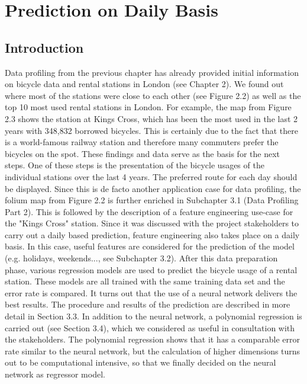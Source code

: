 \section{Prediction on Daily Basis}\label{sec:daily}
\subsection{Introduction}\label{intro_daily}
Data profiling from the previous chapter has already provided initial information on bicycle data and rental stations in London (see Chapter 2). We found out where most of the stations were close to each other (see Figure 2.2) as well as the top 10 most used rental stations in London. For example, the map from Figure 2.3 shows the station at Kings Cross, which has been the most used in the last 2 years with 348,832 borrowed bicycles. This is certainly due to the fact that there is a world-famous railway station and therefore many commuters prefer the bicycles on the spot. These findings and data serve as the basis for the next steps.
One of these steps is the presentation of the bicycle usages of the individual stations over the last 4 years. The preferred route for each day should be displayed. Since this is de facto another application case for data profiling, the folium map from Figure 2.2 is further enriched in Subchapter 3.1 (Data Profiling Part 2).
This is followed by the description of a feature engineering use-case for the "Kings Cross" station. Since it was discussed with the project stakeholders to carry out a daily based prediction, feature engineering also takes place on a daily basis. In this case, useful features are considered for the prediction of the model (e.g. holidays, weekends..., see Subchapter 3.2).
After this data preparation phase, various regression models are used to predict the bicycle usage of a rental station. These models are all trained with the same training data set and the error rate is compared. It turns out that the use of a neural network delivers the best results. The procedure and results of the prediction are described in more detail in Section 3.3.
In addition to the neural network, a polynomial regression is carried out (see Section 3.4), which we considered as useful in consultation with the stakeholders. The polynomial regression shows that it has a comparable error rate similar to the neural network, but the calculation of higher dimensions turns out to be computational intensive, so that we finally decided on the neural network as regressor model.

